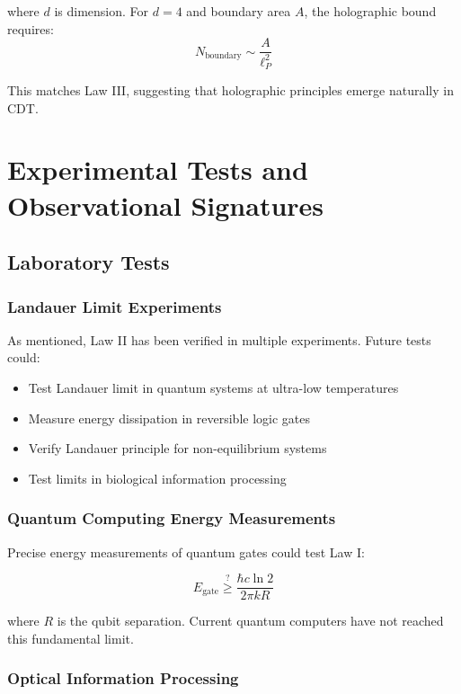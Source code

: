 \documentclass[11pt,a4paper]{article}
\theoremstyle{plain}
\theoremstyle{definition}
\theoremstyle{remark}
\begin{document}
where $d$ is dimension. For $d=4$ and boundary area $A$, the holographic bound requires:
\begin{equation}
N_{\text{boundary}} \sim \frac{A}{\ell_P^2}
\end{equation}

This matches Law III, suggesting that holographic principles emerge naturally in CDT.

\section{Experimental Tests and Observational Signatures}
\label{sec:experimental}

\subsection{Laboratory Tests}

\subsubsection{Landauer Limit Experiments}

As mentioned, Law II has been verified in multiple experiments. Future tests could:

\begin{itemize}[leftmargin=*]
\item Test Landauer limit in quantum systems at ultra-low temperatures
\item Measure energy dissipation in reversible logic gates
\item Verify Landauer principle for non-equilibrium systems
\item Test limits in biological information processing
\end{itemize}

\subsubsection{Quantum Computing Energy Measurements}

Precise energy measurements of quantum gates could test Law I:

\begin{equation}
E_{\text{gate}} \stackrel{?}{\geq} \frac{\hbar c\ln 2}{2\pi kR}
\end{equation}

where $R$ is the qubit separation. Current quantum computers have not reached this fundamental limit.

\subsubsection{Optical Information Processing}
\end{document}
